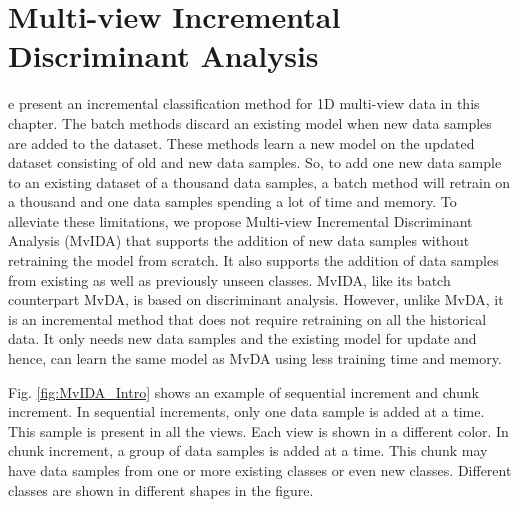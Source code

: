 \chapter{Multi-view Incremental Discriminant Analysis}
\label{ch:MvIDA}
e present an incremental classification method for 1D multi-view data in this chapter. The batch methods discard an existing model when new data samples are added to the dataset. These methods learn a new model on the updated dataset consisting of old and new data samples. So, to add one new data sample to an existing dataset of a thousand data samples, a batch method will retrain on a thousand and one data samples spending a lot of time and memory. To alleviate these limitations, we propose Multi-view Incremental Discriminant Analysis (MvIDA) that supports the addition of new data samples without retraining the model from scratch. It also supports the addition of data samples from existing as well as previously unseen classes. MvIDA, like its batch counterpart MvDA, is based on discriminant analysis. However, unlike MvDA, it is an incremental method that does not require retraining on all the historical data. It only needs new data samples and the existing model for update and hence, can learn the same model as MvDA using less training time and memory.

Fig. \ref{fig:MvIDA_Intro} shows an example of sequential increment and chunk increment. In sequential increments, only one data sample is added at a time. This sample is present in all the views. Each view is shown in a different color. In chunk increment, a group of data samples is added at a time. This chunk may have data samples from one or more existing classes or even new classes. Different classes are shown in different shapes in the figure.

